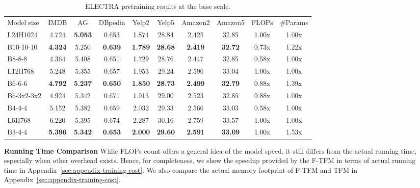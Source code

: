 \documentclass{article}
\theoremstyle{custom}
\begin{document}
\begin{table}[!ht]
\begin{tabular}{@{}lccccccccc@{}}
\toprule
Model size & IMDB & AG & DBpedia & Yelp2 & Yelp5 & Amazon2 & Amazon5 & FLOPs & \#Params \\
\cmidrule(r){1-1} \cmidrule(lr){2-8} \cmidrule(l){9-10}
{L24H1024} 
& 4.724 & \bf 5.053 & 0.653 & 1.874 & 28.84 & 2.425 & 32.85 & {1.00x} & {1.00x} \\
{B10-10-10} 
& \bf 4.324 & 5.250 & \bf 0.639 & \bf 1.789 & \bf 28.68 & \bf 2.419 & \bf 32.72 & {0.73x} & {1.22x} \\
{B8-8-8}
& 4.364 & 5.408 & 0.651 & 1.729 & 28.76 & 2.447 & 32.85 & {0.58x} & {1.00x} \\
\cmidrule(r){1-1} \cmidrule(lr){2-8} \cmidrule(l){9-10}
{L12H768}
& 5.248 & 5.355 & 0.657 & 1.953 & 29.24 & 2.596 & 33.04 & {1.00x} & {1.00x} \\
{B6-6-6}
& \bf 4.792 & \bf 5.237 & \bf 0.650 & \bf 1.850 & \bf 28.73 & \bf 2.499 & \bf 32.79 & {0.88x} & {1.39x} \\
{B6-3x2-3x2}
& 4.924 & 5.342 & 0.671 & 1.913 & 29.00 & 2.523 & 32.85 & {0.88x} & {1.00x} \\
{B4-4-4}
& 5.152 & 5.382 & 0.659 & 2.032 & 29.33 & 2.566 & 33.03 & {0.58x} & {1.00x} \\
\cmidrule(r){1-1} \cmidrule(lr){2-8} \cmidrule(l){9-10}
{L6H768}
& 6.220 & 5.395 & 0.674 & 2.287 & 30.16 & 2.759 & 33.57 & {1.00x} & {1.00x} \\
{B3-4-4}
& \bf 5.396 & \bf 5.342 & \bf 0.653 & \bf 2.000 & \bf 29.60 & \bf 2.591 & \bf 33.09 & {1.00x} & {1.53x} \\
\bottomrule
\end{tabular}
\caption{ELECTRA pretraining results at the base scale.}
\label{tab:fair-comparison-electra}
\vspace{-1.5em}
\end{table}

\textbf{Running Time Comparison}\; While FLOPs count offers a general idea of the model speed, it still differs from the actual running time, especially when other overhead exists.
Hence, for completeness, we show the speedup provided by the F-TFM in terms of actual running time in Appendix~\ref{sec:appendix-training-cost}. We also compare the actual memory footprint of F-TFM and TFM in Appendix~\ref{sec:appendix-training-cost}.
\end{document}
